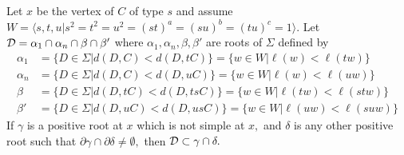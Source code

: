\documentclass[class=book, crop=false,12 pt]{standalone}
\begin{document}
\begin{lemma}
	\label{containD}
	Let $x$ be the vertex of $C$ of type $s$ and assume $W=\langle s,t,u|s^2=t^2=u^2=(st)^a=(su)^b=(tu)^c=1\rangle.$ Let $\mathcal{D}=\alpha_1\cap \alpha_n\cap \beta\cap \beta'$ where $\alpha_1,\alpha_n,\beta,\beta'$ are roots of $\Sigma$ defined by
\begin{align*}
	\alpha_1&=\{D\in \Sigma|d(D,C)<d(D,tC)\}=\{w\in W|\ell(w)<\ell(tw)\}\\
	\alpha_n&=\{D\in \Sigma|d(D,C)<d(D,uC)\}=\{w\in W|\ell(w)<\ell(uw)\}\\
	\beta&=\{D\in \Sigma|d(D,tC)<d(D,tsC)\}=\{w\in W|\ell(tw)<\ell(stw)\}\\
	\beta'&=\{D\in \Sigma|d(D,uC)<d(D,usC)\}=\{w\in W|\ell(uw)<\ell(suw)\}
\end{align*}
If $\gamma$ is a positive root at $x$ which is not simple at $x,$ and $\delta$ is any other positive root such that $\partial\gamma\cap \partial\delta\neq \emptyset,$ then $\mathcal{D}\subset \gamma\cap \delta.$
\end{lemma}
\end{document}
